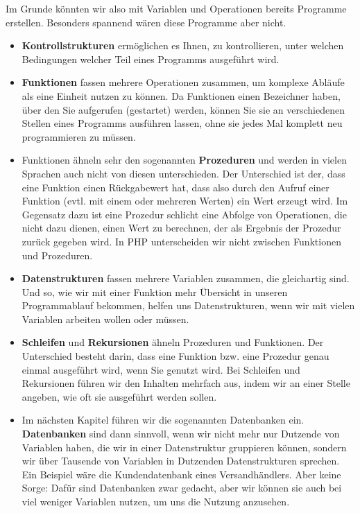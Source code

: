 Im Grunde könnten wir also mit Variablen und Operationen bereits Programme erstellen. Besonders spannend wären diese Programme aber nicht.
	
\begin{itemize}	
	\item \textbf{Kontrollstrukturen} ermöglichen es Ihnen, zu kontrollieren, unter welchen Bedingungen welcher Teil eines Programms ausgeführt wird.
	
	\item \textbf{Funktionen} fassen mehrere Operationen zusammen, um komplexe Abläufe als eine Einheit nutzen zu können. Da Funktionen einen Bezeichner haben, über den Sie aufgerufen (\glqq{}gestartet\grqq{}) werden, können Sie sie an verschiedenen Stellen eines Programms ausführen lassen, ohne sie jedes Mal komplett neu programmieren zu müssen.
	
	\item Funktionen ähneln sehr den sogenannten \textbf{Prozeduren} und werden in vielen Sprachen auch nicht von diesen unterschieden. Der Unterschied ist der, dass eine Funktion einen Rückgabewert hat, dass also durch den Aufruf einer Funktion (evtl. mit einem oder mehreren Werten) ein Wert erzeugt wird. Im Gegensatz dazu ist eine Prozedur schlicht eine Abfolge von Operationen, die nicht dazu dienen, einen Wert zu berechnen, der als Ergebnis der Prozedur zurück gegeben wird. In PHP unterscheiden wir nicht zwischen Funktionen und Prozeduren.
	
	\item \textbf{Datenstrukturen} fassen mehrere Variablen zusammen, die gleichartig sind. Und so, wie wir mit einer Funktion mehr Übersicht in unseren Programmablauf bekommen, helfen uns Datenstrukturen, wenn wir mit vielen Variablen arbeiten wollen oder müssen.
	
	\item \textbf{Schleifen} und \textbf{Rekursionen} ähneln Prozeduren und Funktionen. Der Unterschied besteht darin, dass eine Funktion bzw. eine Prozedur genau einmal ausgeführt wird, wenn Sie genutzt wird. Bei Schleifen und Rekursionen führen wir den Inhalten mehrfach aus, indem wir an einer Stelle angeben, wie oft sie ausgeführt werden sollen.
	
	\item Im nächsten Kapitel führen wir die sogenannten Datenbanken ein. \textbf{Datenbanken} sind dann sinnvoll, wenn wir nicht mehr nur Dutzende von Variablen haben, die wir in einer Datenstruktur gruppieren können, sondern wir über Tausende von Variablen in Dutzenden Datenstrukturen sprechen. Ein Beispiel wäre die Kundendatenbank eines Versandhändlers. Aber keine Sorge: Dafür sind Datenbanken zwar gedacht, aber wir können sie auch bei viel weniger Variablen nutzen, um uns die Nutzung anzusehen.
	

\end{itemize}
